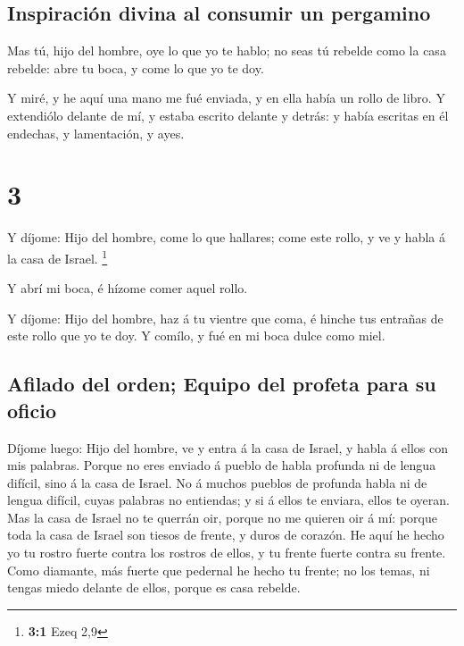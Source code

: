 \hypertarget{inspiraciuxf3n-divina-al-consumir-un-pergamino}{%
\subsection{Inspiración divina al consumir un
pergamino}\label{inspiraciuxf3n-divina-al-consumir-un-pergamino}}

 Mas tú, hijo del hombre, oye lo que yo te hablo; no seas
tú rebelde como la casa rebelde: abre tu boca, y come lo que yo te doy.

 Y miré, y he aquí una mano me fué enviada, y en ella
había un rollo de libro.  Y extendiólo delante de mí, y
estaba escrito delante y detrás: y había escritas en él endechas, y
lamentación, y ayes.

\hypertarget{section-2}{%
\section{3}\label{section-2}}

 Y díjome: Hijo del hombre, come lo que hallares; come
este rollo, y ve y habla á la casa de Israel. \footnote{\textbf{3:1}
  Ezeq 2,9}

 Y abrí mi boca, é hízome comer aquel rollo.

 Y díjome: Hijo del hombre, haz á tu vientre que coma, é
hinche tus entrañas de este rollo que yo te doy. Y comílo, y fué en mi
boca dulce como miel.

\hypertarget{afilado-del-orden-equipo-del-profeta-para-su-oficio}{%
\subsection{Afilado del orden; Equipo del profeta para su
oficio}\label{afilado-del-orden-equipo-del-profeta-para-su-oficio}}

 Díjome luego: Hijo del hombre, ve y entra á la casa de
Israel, y habla á ellos con mis palabras.  Porque no eres
enviado á pueblo de habla profunda ni de lengua difícil, sino á la casa
de Israel.  No á muchos pueblos de profunda habla ni de
lengua difícil, cuyas palabras no entiendas; y si á ellos te enviara,
ellos te oyeran.  Mas la casa de Israel no te querrán oir,
porque no me quieren oir á mí: porque toda la casa de Israel son tiesos
de frente, y duros de corazón.  He aquí he hecho yo tu
rostro fuerte contra los rostros de ellos, y tu frente fuerte contra su
frente.  Como diamante, más fuerte que pedernal he hecho
tu frente; no los temas, ni tengas miedo delante de ellos, porque es
casa rebelde.


